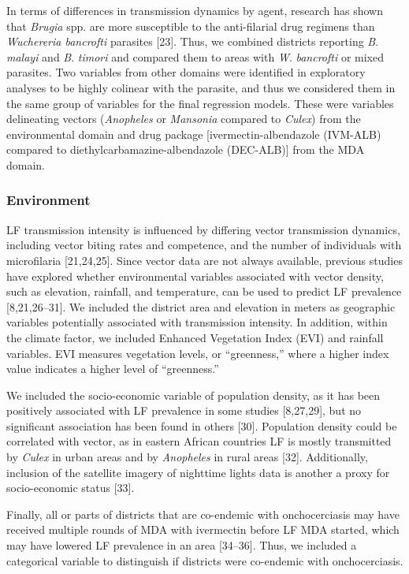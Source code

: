 \documentclass[11pt,a4paper]{article}
\begin{document}
In terms of differences in transmission dynamics by agent, research has shown that \textit{Brugia} spp. are more susceptible to the anti-filarial drug regimens than \textit{Wuchereria bancrofti} parasites [23]. Thus, we combined districts reporting \textit{B}. \textit{malayi} and \textit{B}. \textit{timori} and compared them to areas with \textit{W}. \textit{bancrofti} or mixed parasites. Two variables from other domains were identified in exploratory analyses to be highly colinear with the parasite, and thus we considered them in the same group of variables for the final regression models. These were variables delineating vectors (\textit{Anopheles} or \textit{Mansonia} compared to \textit{Culex}) from the environmental domain and drug package [ivermectin-albendazole (IVM-ALB) compared to diethylcarbamazine-albendazole (DEC-ALB)] from the MDA domain.

\subsubsection{Environment}

LF transmission intensity is influenced by differing vector transmission dynamics, including vector biting rates and competence, and the number of individuals with microfilaria [21,24,25]. Since vector data are not always available, previous studies have explored whether environmental variables associated with vector density, such as elevation, rainfall, and temperature, can be used to predict LF prevalence [8,21,26–31]. We included the district area and elevation in meters as geographic variables potentially associated with transmission intensity. In addition, within the climate factor, we included Enhanced Vegetation Index (EVI) and rainfall variables. EVI measures vegetation levels, or “greenness,” where a higher index value indicates a higher level of “greenness.”

We included the socio-economic variable of population density, as it has been positively associated with LF prevalence in some studies [8,27,29], but no significant association has been found in others [30]. Population density could be correlated with vector, as in eastern African countries LF is mostly transmitted by \textit{Culex} in urban areas and by \textit{Anopheles} in rural areas [32]. Additionally, inclusion of the satellite imagery of nighttime lights data is another a proxy for socio-economic status [33].

Finally, all or parts of districts that are co-endemic with onchocerciasis may have received multiple rounds of MDA with ivermectin before LF MDA started, which may have lowered LF prevalence in an area [34–36]. Thus, we included a categorical variable to distinguish if districts were co-endemic with onchocerciasis.
\end{document}
